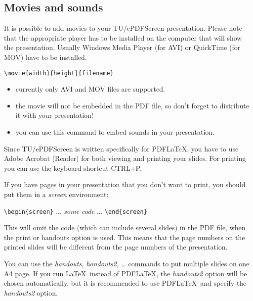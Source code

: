 \documentclass[a4paper]{article}            %
\begin{document}
\begin{slidetop}
\section*{Movies and sounds}

\newlength{\parlength}
\setlength{\parlength}{\textwidth}
\addtolength{\parlength}{-4.3cm}
\begin{minipage}[t]{\parlength}
It is possible to add movies to your TU/ePDFScreen presentation. Please note that the appropriate player has to be installed on the computer that will show the presentation. Usually Windows Media Player (for AVI) or QuickTime (for MOV) have to be installed.
\end{minipage}%
\hfill
{}

\verb|\movie{width}{height}{filename}|\\

\begin{itemize}
\item currently only AVI and MOV files are supported.
\item the movie will not be embedded in the PDF file, so don't forget to distribute it with your presentation!
\item you can use this command to embed sounds in your presentation.
\end{itemize}
\end{slidetop}

\begin{slidetop}

Since TU/ePDFScreen is written specifically for PDF\LaTeX, you have to use Adobe Acrobat (Reader) for both viewing and printing your slides. For printing you can use the keyboard shortcut CTRL+P.

If you have pages in your presentation that you don't want to print, you should put them in a {\em screen} environment:

\verb|\begin{screen}| $\ldots$ {\it some code} $\ldots$ \verb|\end{screen}|

This will omit the code (which can include several slides) in the PDF file, when the \textsf{print} or \textsf{handouts} option is used.
This means that the page numbers on the printed slides will be different from the page numbers of the presentation.

You can use the {\em handouts, handouts2, \ldots} commands to put multiple slides on one A4 page. If you run \LaTeX\ instead of PDF\LaTeX, the {\em handouts2} option will be chosen automatically, but it is recommended to use PDF\LaTeX\ and specify the {\em handouts2} option.
\end{slidetop}
\end{document}
